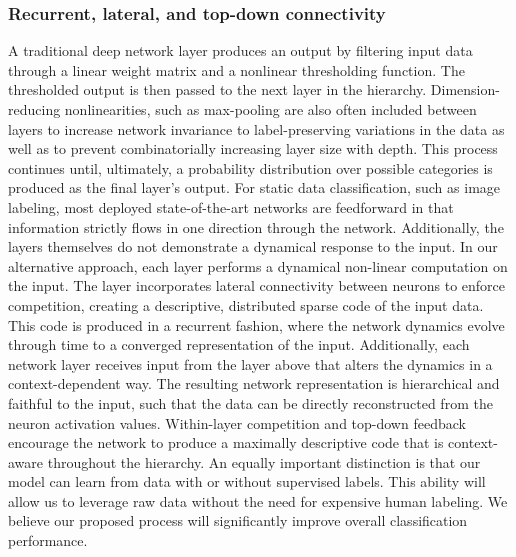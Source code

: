\subsubsection{Recurrent, lateral, and top-down connectivity}
A traditional deep network layer produces an output by filtering input data through a linear weight matrix and a nonlinear thresholding function. The thresholded output is then passed to the next layer in the hierarchy. Dimension-reducing nonlinearities, such as max-pooling are also often included between layers to increase network invariance to label-preserving variations in the data as well as to prevent combinatorially increasing layer size with depth. This process continues until, ultimately, a probability distribution over possible categories is produced as the final layer’s output. For static data classification, such as image labeling, most deployed state-of-the-art networks are feedforward in that information strictly flows in one direction through the network. Additionally, the layers themselves do not demonstrate a dynamical response to the input. In our alternative approach, each layer performs a dynamical non-linear computation on the input. The layer incorporates lateral connectivity between neurons to enforce competition, creating a descriptive, distributed sparse code of the input data. This code is produced in a recurrent fashion, where the network dynamics evolve through time to a converged representation of the input. Additionally, each network layer receives input from the layer above that alters the dynamics in a context-dependent way. The resulting network representation is hierarchical and faithful to the input, such that the data can be directly reconstructed from the neuron activation values. Within-layer competition and top-down feedback encourage the network to produce a maximally descriptive code that is context-aware throughout the hierarchy. An equally important distinction is that our model can learn from data with or without supervised labels. This ability will allow us to leverage raw data without the need for expensive human labeling. We believe our proposed process will significantly improve overall classification performance.
